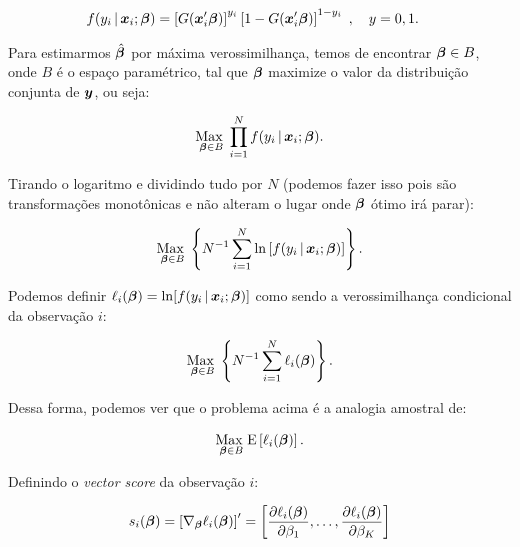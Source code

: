 \documentclass[11pt, oneside, a4paper, article]{article}
\numberwithin{equation}{section}
\begin{document}
\begin{description}
	\vspace{-1 em}
	\begin{align*}
		f( y_{i} \, | \, \boldsymbol{x}_{i} ; \boldsymbol{\beta} ) 
		&= 
		\left[ G(\boldsymbol{x}_{i}' \boldsymbol{\beta} )  \right]^{y_{i}}
		\left[ 1 - G(\boldsymbol{x}_{i}' \boldsymbol{\beta} )  \right]^{1 - y_{i}}
		\; , \quad y=0,1.
	\end{align*}

	Para estimarmos $\hat{\boldsymbol{\beta}}$ por máxima verossimilhança, temos de encontrar $\boldsymbol{\beta} \in B$, onde $B$ é o espaço paramétrico, tal que $\boldsymbol{\beta}$ maximize o valor da distribuição conjunta de $\boldsymbol{y}$, ou seja:

	\vspace{-1 em}
	\begin{align*}
		\underset{\boldsymbol{\beta} \in B}{\text{Max }} 
		\prod_{i=1}^{N}
		f( y_{i} \, | \, \boldsymbol{x}_{i} ; \boldsymbol{\beta} ).
	\end{align*}

	\noindent

	Tirando o logaritmo e dividindo tudo por $N$ (podemos fazer isso pois são transformações monotônicas e não alteram o lugar onde $\boldsymbol{\beta}$ ótimo irá parar):

	\vspace{-1 em}
	\begin{align*}
		\underset{\boldsymbol{\beta} \in B}{\text{Max }} 
		\left\{ 
			N^{-1} \sum_{i=1}^{N}
			\ln \left[ f( y_{i} \, | \, \boldsymbol{x}_{i} ; \boldsymbol{\beta} ) \right]
		\right\}.
	\end{align*}

	\noindent
	Podemos definir
	$\ell_{i}( \boldsymbol{\beta} ) = \ln[ f( y_{i} \, | \, \boldsymbol{x}_{i} ; \boldsymbol{\beta} ) ]$
	como sendo a verossimilhança condicional da observação $i$:

	\vspace{-1 em}
	\begin{align*}
		\underset{\boldsymbol{\beta} \in B}{\text{Max }} 
		\left\{ 
			N^{-1} \sum_{i=1}^{N} \ell_{i} (\boldsymbol{\beta})
		\right\}.
	\end{align*}

	Dessa forma, podemos ver que o problema acima é a analogia amostral de:

	\vspace{-1 em}
	\begin{align*}
		\underset{\boldsymbol{\beta} \in B}{\text{Max }} 
		\text{E} \left[ 
			\ell_{i} ( \boldsymbol{\beta} )
		\right].
	\end{align*}

	Definindo o \textit{vector score} da observação $i$:

	\vspace{-1 em}
	\begin{align*}
		s_{i} (\boldsymbol{\beta}) = 
		\left[ \nabla_{\boldsymbol{\beta}} \ell_{i} (\boldsymbol{\beta}) \right]'
		=
		\begin{bmatrix}
			\dfrac{\partial{\ell_{i} (\ensuremath{\boldsymbol{\beta}})}}{\partial{\beta_{1}}},
			\dots,
			\dfrac{\partial{\ell_{i} (\ensuremath{\boldsymbol{\beta}})}}{\partial{\beta_{K}}}
		\end{bmatrix}
	\end{align*}


\end{description}
\end{document}
